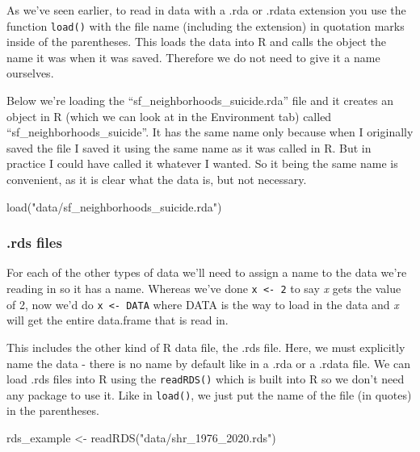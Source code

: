 \documentclass[
]{krantz}
\makeatletter
\newenvironment{Shaded}{\begin{snugshade}}{\end{snugshade}}
\newcommand{\FunctionTok}[1]{\textcolor[rgb]{0,0,0}{#1}}
\newcommand{\NormalTok}[1]{#1}
\newcommand{\OtherTok}[1]{\textcolor[rgb]{0.37,0.37,0.37}{#1}}
\newcommand{\StringTok}[1]{\textcolor[rgb]{0.5,0.5,0.5}{#1}}
\newenvironment{kframe}{%
\medskip{}
\setlength{\fboxsep}{.8em}
 \def\at@end@of@kframe{}%
 \ifinner\ifhmode%
  \def\at@end@of@kframe{\end{minipage}}%
  \begin{minipage}{\columnwidth}%
 \fi\fi%
 \def\FrameCommand##1{\hskip\@totalleftmargin \hskip-\fboxsep
 \colorbox{shadecolor}{##1}\hskip-\fboxsep
     \hskip-\linewidth \hskip-\@totalleftmargin \hskip\columnwidth}%
 \MakeFramed {\advance\hsize-\width
   \@totalleftmargin\z@ \linewidth\hsize
   \@setminipage}}%
 {\par\unskip\endMakeFramed%
 \at@end@of@kframe}
\renewenvironment{Shaded}{\begin{kframe}}{\end{kframe}}
\makeatother
\begin{document}
As we've seen earlier, to read in data with a .rda or .rdata extension you use the function \texttt{load()} with the file name (including the extension) in quotation marks inside of the parentheses. This loads the data into R and calls the object the name it was when it was saved. Therefore we do not need to give it a name ourselves.

Below we're loading the ``sf\_neighborhoods\_suicide.rda'' file and it creates an object in R (which we can look at in the Environment tab) called ``sf\_neighborhoods\_suicide''. It has the same name only because when I originally saved the file I saved it using the same name as it was called in R. But in practice I could have called it whatever I wanted. So it being the same name is convenient, as it is clear what the data is, but not necessary.

\begin{Shaded}
\begin{Highlighting}[]
\FunctionTok{load}\NormalTok{(}\StringTok{"data/sf\_neighborhoods\_suicide.rda"}\NormalTok{)}
\end{Highlighting}
\end{Shaded}

\hypertarget{rds-files}{%
\subsubsection{.rds files}\label{rds-files}}

For each of the other types of data we'll need to assign a name to the data we're reading in so it has a name. Whereas we've done \texttt{x\ \textless{}-\ 2} to say \emph{x} gets the value of 2, now we'd do \texttt{x\ \textless{}-\ DATA} where DATA is the way to load in the data and \emph{x} will get the entire data.frame that is read in.

This includes the other kind of R data file, the .rds file. Here, we must explicitly name the data - there is no name by default like in a .rda or a .rdata file. We can load .rds files into R using the \texttt{readRDS()} which is built into R so we don't need any package to use it. Like in \texttt{load()}, we just put the name of the file (in quotes) in the parentheses.

\begin{Shaded}
\begin{Highlighting}[]
\NormalTok{rds\_example }\OtherTok{\textless{}{-}} \FunctionTok{readRDS}\NormalTok{(}\StringTok{"data/shr\_1976\_2020.rds"}\NormalTok{) }
\end{Highlighting}
\end{Shaded}
\end{document}
